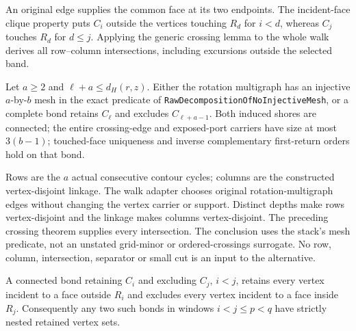 An original edge supplies the common face at its two endpoints.  The
incident-face clique property puts $C_i$ outside the vertices touching
$R_d$ for $i<d$, whereas $C_j$ touches $R_d$ for $d\le j$.  Applying the
generic crossing lemma to the whole walk derives all row--column
intersections, including excursions outside the selected band.

\begin{theorem}
Let $a\ge2$ and $\ell+a\le d_H(r,z)$.  Either the rotation
multigraph has an injective $a$-by-$b$ mesh in the exact predicate of
\texttt{RawDecompositionOfNoInjectiveMesh}, or a complete bond retains
$C_\ell$ and excludes $C_{\ell+a-1}$.  Both induced shores are connected;
the entire crossing-edge and exposed-port carriers have size at most
$3(b-1)$; touched-face uniqueness and inverse complementary first-return
orders hold on that bond.
\end{theorem}

Rows are the $a$ actual consecutive contour cycles; columns are the
constructed vertex-disjoint linkage.  The walk adapter chooses original
rotation-multigraph edges without changing the vertex carrier or support.
Distinct depths make rows vertex-disjoint and the linkage makes columns
vertex-disjoint.  The preceding crossing theorem supplies every
intersection.  The conclusion uses the stack's mesh predicate, not an
unstated grid-minor or ordered-crossings surrogate.  No row, column,
intersection, separator or small cut is an input to the alternative.

\begin{theorem}
A connected bond retaining $C_i$ and excluding $C_j$, $i<j$, retains
every vertex incident to a face outside $R_i$ and excludes every vertex
incident to a face inside $R_j$.  Consequently any two such bonds in
windows $i<j\le p<q$ have strictly nested retained vertex sets.
\end{theorem}

